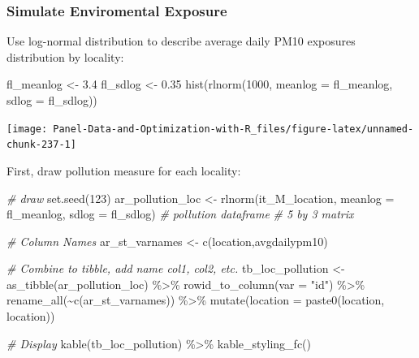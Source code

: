 \documentclass[
]{book}
\newenvironment{Shaded}{\begin{snugshade}}{\end{snugshade}}
\newcommand{\AttributeTok}[1]{\textcolor[rgb]{0.77,0.63,0.00}{#1}}
\newcommand{\CommentTok}[1]{\textcolor[rgb]{0.56,0.35,0.01}{\textit{#1}}}
\newcommand{\DecValTok}[1]{\textcolor[rgb]{0.00,0.00,0.81}{#1}}
\newcommand{\FloatTok}[1]{\textcolor[rgb]{0.00,0.00,0.81}{#1}}
\newcommand{\FunctionTok}[1]{\textcolor[rgb]{0.00,0.00,0.00}{#1}}
\newcommand{\NormalTok}[1]{#1}
\newcommand{\OtherTok}[1]{\textcolor[rgb]{0.56,0.35,0.01}{#1}}
\newcommand{\SpecialCharTok}[1]{\textcolor[rgb]{0.00,0.00,0.00}{#1}}
\newcommand{\StringTok}[1]{\textcolor[rgb]{0.31,0.60,0.02}{#1}}
\begin{document}
\hypertarget{simulate-enviromental-exposure}{%
\subsubsection{Simulate Enviromental Exposure}\label{simulate-enviromental-exposure}}

Use log-normal distribution to describe average daily PM10 exposures distribution by locality:

\begin{Shaded}
\begin{Highlighting}[]
\NormalTok{fl\_meanlog }\OtherTok{\textless{}{-}} \FloatTok{3.4}
\NormalTok{fl\_sdlog }\OtherTok{\textless{}{-}} \FloatTok{0.35}
\FunctionTok{hist}\NormalTok{(}\FunctionTok{rlnorm}\NormalTok{(}\DecValTok{1000}\NormalTok{, }\AttributeTok{meanlog =}\NormalTok{ fl\_meanlog, }\AttributeTok{sdlog =}\NormalTok{ fl\_sdlog))}
\end{Highlighting}
\end{Shaded}

\begin{center}\texttt{[image: Panel-Data-and-Optimization-with-R\_files/figure-latex/unnamed-chunk-237-1]} \end{center}

First, draw pollution measure for each locality:

\begin{Shaded}
\begin{Highlighting}[]
\CommentTok{\# draw}
\FunctionTok{set.seed}\NormalTok{(}\DecValTok{123}\NormalTok{)}
\NormalTok{ar\_pollution\_loc }\OtherTok{\textless{}{-}} \FunctionTok{rlnorm}\NormalTok{(it\_M\_location, }\AttributeTok{meanlog =}\NormalTok{ fl\_meanlog, }\AttributeTok{sdlog =}\NormalTok{ fl\_sdlog)}
\CommentTok{\# pollution dataframe}
\CommentTok{\# 5 by 3 matrix}

\CommentTok{\# Column Names}
\NormalTok{ar\_st\_varnames }\OtherTok{\textless{}{-}} \FunctionTok{c}\NormalTok{(}\StringTok{\textquotesingle{}location\textquotesingle{}}\NormalTok{,}\StringTok{\textquotesingle{}avgdailypm10\textquotesingle{}}\NormalTok{)}

\CommentTok{\# Combine to tibble, add name col1, col2, etc.}
\NormalTok{tb\_loc\_pollution }\OtherTok{\textless{}{-}} \FunctionTok{as\_tibble}\NormalTok{(ar\_pollution\_loc) }\SpecialCharTok{\%\textgreater{}\%}
  \FunctionTok{rowid\_to\_column}\NormalTok{(}\AttributeTok{var =} \StringTok{"id"}\NormalTok{) }\SpecialCharTok{\%\textgreater{}\%}
  \FunctionTok{rename\_all}\NormalTok{(}\SpecialCharTok{\textasciitilde{}}\FunctionTok{c}\NormalTok{(ar\_st\_varnames)) }\SpecialCharTok{\%\textgreater{}\%}
  \FunctionTok{mutate}\NormalTok{(}\AttributeTok{location =} \FunctionTok{paste0}\NormalTok{(}\StringTok{\textquotesingle{}location\textquotesingle{}}\NormalTok{, location))}

\CommentTok{\# Display}
\FunctionTok{kable}\NormalTok{(tb\_loc\_pollution) }\SpecialCharTok{\%\textgreater{}\%} \FunctionTok{kable\_styling\_fc}\NormalTok{()}
\end{Highlighting}
\end{Shaded}
\end{document}
